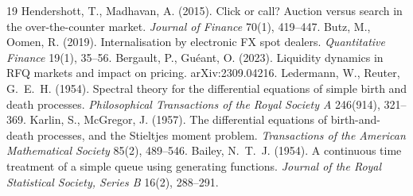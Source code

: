 \documentclass[11pt]{article}
\begin{document}
\begin{thebibliography}{19}
 Hendershott, T., Madhavan, A. (2015). Click or call? Auction versus search in the over-the-counter market. \emph{Journal of Finance} 70(1), 419--447.
 Butz, M., Oomen, R. (2019). Internalisation by electronic FX spot dealers. \emph{Quantitative Finance} 19(1), 35--56.
 Bergault, P., Gu\'eant, O. (2023). Liquidity dynamics in RFQ markets and impact on pricing. arXiv:2309.04216.
 Ledermann, W., Reuter, G.~E.~H. (1954). Spectral theory for the differential equations of simple birth and death processes. \emph{Philosophical Transactions of the Royal Society A} 246(914), 321--369.
 Karlin, S., McGregor, J. (1957). The differential equations of birth-and-death processes, and the Stieltjes moment problem. \emph{Transactions of the American Mathematical Society} 85(2), 489--546.
 Bailey, N.~T.~J. (1954). A continuous time treatment of a simple queue using generating functions. \emph{Journal of the Royal Statistical Society, Series B} 16(2), 288--291.
\end{thebibliography}
\end{document}

